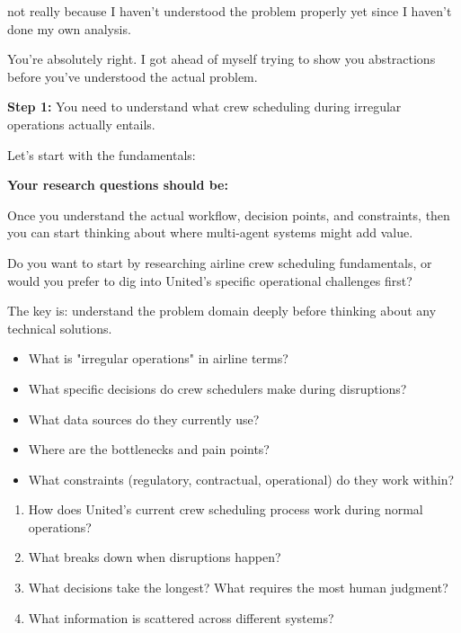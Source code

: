 \begin{userprompt}
not really because I haven't understood the problem properly yet since I haven't done my own analysis.
\end{userprompt}

\begin{botresponse}
You're absolutely right. I got ahead of myself trying to show you abstractions before you've understood the actual problem.

\textbf{Step 1:} You need to understand what crew scheduling during irregular operations actually entails.

Let's start with the fundamentals:

\textbf{Your research questions should be:}

Once you understand the actual workflow, decision points, and constraints, then you can start thinking about where multi-agent systems might add value.

Do you want to start by researching airline crew scheduling fundamentals, or would you prefer to dig into United's specific operational challenges first?

The key is: understand the problem domain deeply before thinking about any technical solutions.

\begin{itemize}
\item What is "irregular operations" in airline terms?
\item What specific decisions do crew schedulers make during disruptions?
\item What data sources do they currently use?
\item Where are the bottlenecks and pain points?
\item What constraints (regulatory, contractual, operational) do they work within?
\end{itemize}

\begin{enumerate}
\item How does United's current crew scheduling process work during normal operations?
\item What breaks down when disruptions happen?
\item What decisions take the longest? What requires the most human judgment?
\item What information is scattered across different systems?
\end{enumerate}
\end{botresponse}

